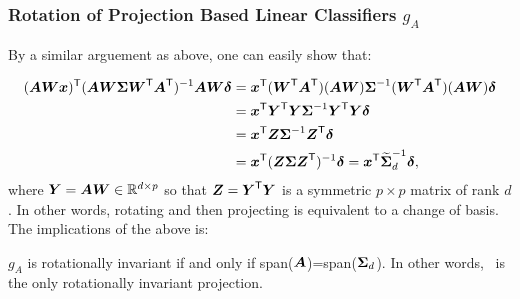 \documentclass[10pt]{article}
\begin{document}



\subsubsection{Rotation of Projection Based Linear Classifiers $g_A$}

By a similar arguement as above, one can easily show that:
% 

\begin{align*}
(\bA  \bW \bx) \T  (\bA \bW  \bSig  \bW\T \bA\T)^{-1} \bA \bW \bdel 
&= \bx\T (\bW\T \bA\T) (\bA \bW) \bSig^{-1} (\bW\T \bA\T) (\bA \bW) \bdel \\
&= \bx\T \bY\T \bY \bSig^{-1} \bY\T \bY \bdel \\
&= \bx\T \bZ \bSig^{-1} \bZ\T \bdel \\
&= \bx\T (\bZ \bSig \bZ\T)^{-1} \bdel = \bx\T \mt{\bSig}_d^{-1} \bdel,
\end{align*}
where $\bY = \bA \bW \in \Real^{d \times p}$ so that $\bZ=\bY\T \bY$ is a symmetric ${p \times p}$ matrix of rank $d$.  In other words, rotating and then projecting is equivalent to a change of basis.
The implications of the above is: 
\begin{lem}
$g_A$ is rotationally invariant if and only if span($\bA$)=span($\bSig_d$).
In other words, \Pca~is the only rotationally invariant projection.
\end{lem}



\end{document}
